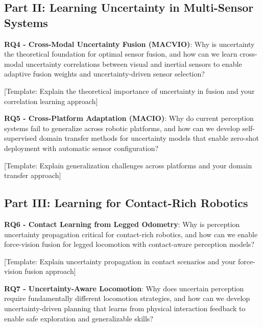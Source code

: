 \subsection{Part II: Learning Uncertainty in Multi-Sensor Systems}

\begin{framed}
\textbf{RQ4 - Cross-Modal Uncertainty Fusion (MACVIO)}: Why is uncertainty the theoretical foundation for optimal sensor fusion, and how can we learn cross-modal uncertainty correlations between visual and inertial sensors to enable adaptive fusion weights and uncertainty-driven sensor selection?
\end{framed}

[Template: Explain the theoretical importance of uncertainty in fusion and your correlation learning approach]

\begin{framed}
\textbf{RQ5 - Cross-Platform Adaptation (MACIO)}: Why do current perception systems fail to generalize across robotic platforms, and how can we develop self-supervised domain transfer methods for uncertainty models that enable zero-shot deployment with automatic sensor configuration?
\end{framed}

[Template: Explain generalization challenges across platforms and your domain transfer approach]

\subsection{Part III: Learning for Contact-Rich Robotics}

\begin{framed}
\textbf{RQ6 - Contact Learning from Legged Odometry}: Why is perception uncertainty propagation critical for contact-rich robotics, and how can we enable force-vision fusion for legged locomotion with contact-aware perception models?
\end{framed}

[Template: Explain uncertainty propagation in contact scenarios and your force-vision fusion approach]

\begin{framed}
\textbf{RQ7 - Uncertainty-Aware Locomotion}: Why does uncertain perception require fundamentally different locomotion strategies, and how can we develop uncertainty-driven planning that learns from physical interaction feedback to enable safe exploration and generalizable skills?
\end{framed}

